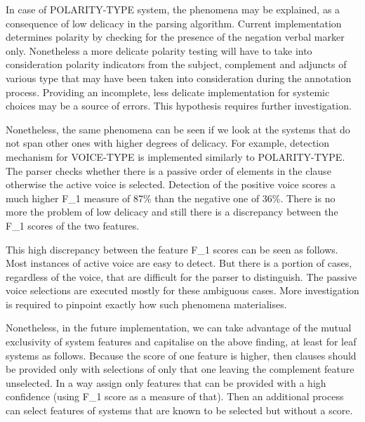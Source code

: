 In case of POLARITY-TYPE system, the phenomena may be explained, as a consequence of low delicacy in the parsing algorithm. Current implementation determines polarity by checking for the presence of the negation verbal marker only. Nonetheless a more delicate polarity testing will have to take into consideration polarity indicators from the subject, complement and adjuncts of various type that may have been taken into consideration during the annotation process. Providing an incomplete, less delicate implementation for systemic choices may be a source of errors. This hypothesis requires further investigation.  %

Nonetheless, the same phenomena can be seen if we look at the systems that do not span other ones with higher degrees of delicacy. For example, detection mechanism for VOICE-TYPE is implemented similarly to POLARITY-TYPE. The parser checks whether there is a passive order of elements in the clause otherwise the active voice is selected.  Detection of the positive voice scores a much higher F_1 measure of 87\% than the negative one of 36\%. There is no more the problem of low delicacy and still there is a discrepancy between the F_1 scores of the two features. %

This high discrepancy between the feature F_1 scores can be seen as follows. Most instances of active voice are easy to detect. But there is a portion of cases, regardless of the voice, that are difficult for the parser to distinguish. The passive voice selections are executed mostly for these ambiguous cases. More investigation is required to pinpoint exactly how such phenomena materialises.

Nonetheless, in the future implementation, we can take advantage of the mutual exclusivity of system features and capitalise on the above finding, at least for leaf systems as follows. Because the score of one feature is higher, then clauses should be provided only with selections of only that one leaving the complement feature unselected. In a way assign only features that can be provided with a high confidence (using F_1 score as a measure of that). Then an additional process can select features of systems that are known to be selected but without a score. 


